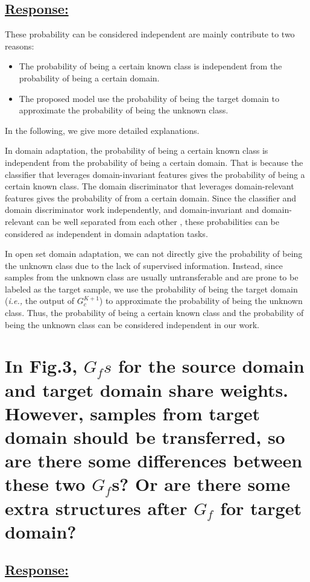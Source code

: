 \subsection*{\underline{\textbf{Response:}}}

These probability can be considered independent are mainly contribute to two reasons:
\begin{itemize}[topsep=0pt]
    \small
    \item The probability of being a certain known class is independent from the probability of being a certain domain.
    \item The proposed model use the probability of being the target domain to approximate the probability of being the unknown class.
\end{itemize}
In the following, we give more detailed explanations.

In domain adaptation, the probability of being a certain known class is independent from the probability of being a certain domain.
That is because the classifier that leverages domain-invariant features gives the probability of being a certain known class.
The domain discriminator that leverages domain-relevant features gives the probability of from a certain domain.
Since the classifier and domain discriminator work independently, and domain-invariant and domain-relevant can be well separated from each other \cite{DomainAgnostic}, these probabilities can be considered as independent in domain adaptation tasks.

In open set domain adaptation, we can not directly give the probability of being the unknown class due to the lack of supervised information.
Instead, since samples from the unknown class are usually untransferable and are prone to be labeled as the target sample, we use the probability of being the target domain (\textit{i.e.,} the output of $G_c^{K+1}$) to approximate the probability of being the unknown class.
Thus, the probability of being a certain known class and the probability of being the unknown class can be considered independent in our work.


\section{In Fig.3, $G_fs$ for the source domain and target domain share weights.
However, samples from target domain should be transferred, so are there some differences between these two $G_f$s?
Or are there some extra structures after $G_f$ for target domain?}
\subsection*{\underline{\textbf{Response:}}}

